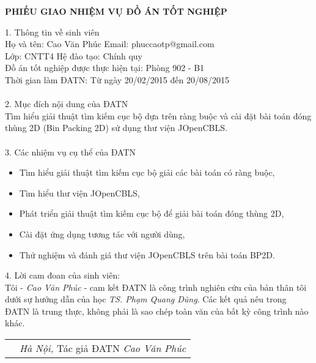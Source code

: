 {\fontsize{14}{1}\selectfont\centering\bfseries
    PHIẾU GIAO NHIỆM VỤ ĐỒ ÁN TỐT NGHIỆP
\par}%

\fontsize{12}{14.4}
\selectfont

{\noindent
\setlength{\parindent}{0pt}

1. Thông tin về sinh viên\\
Họ và tên: Cao Văn Phúc \hspace{4.6cm} Email: phuccaotp@gmail.com\\
Lớp: CNTT4 \hspace{7.6cm} Hệ đào tạo: Chính quy\\
Đồ án tốt nghiệp được thực hiện tại: Phòng 902 - B1\\
Thời gian làm ĐATN: Từ ngày 20/02/2015 đến 20/08/2015\\
\\
2. Mục đích nội dung của ĐATN\\
Tìm hiểu giải thuật tìm kiếm cục bộ dựa trên ràng buộc và cài đặt
bài toán đóng thùng 2D (Bin Packing 2D) sử dụng thư viện JOpenCBLS.\\
\\
3. Các nhiệm vụ cụ thể của ĐATN
\begin{itemize}
    \item Tìm hiểu giải thuật tìm kiếm cục bộ giải các bài toán có ràng buộc,
    \item Tìm hiểu thư viện JOpenCBLS,
    \item Phát triển giải thuật tìm kiếm cục bộ để giải bài toán đóng thùng 2D,
    \item Cài đặt ứng dụng tương tác với người dùng,
    \item Thử nghiệm và đánh giá thư viện JOpenCBLS trên bài toán BP2D.
\end{itemize}

4. Lời cam đoan của sinh viên:\\
Tôi - \textit{Cao Văn Phúc} - cam kết ĐATN là công trình nghiên cứu của bản
thân tôi dưới sự hướng dẫn của học \textit{TS. Phạm Quang Dũng}.
Các kết quả nêu trong ĐATN là trung thực, không phải là sao chép toàn văn của
bất kỳ công trình nào khác.

\begin{table}[H]
    \centering
    \begin{tabular}{P{0.45\textwidth} P{0.45\textwidth}}
        & \textit{Hà Nội, }\newline
            Tác giả ĐATN\newline
            \newline
            \newline
          \textit{Cao Văn Phúc}\\
    \end{tabular}
\end{table}


}

